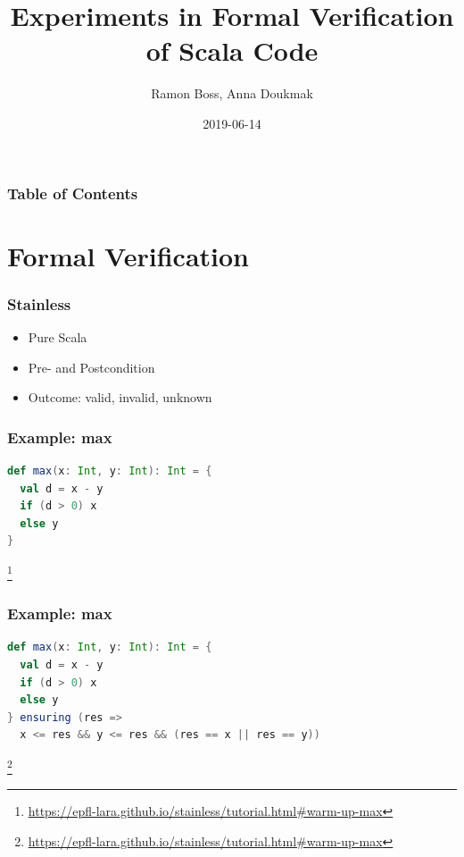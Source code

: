 \documentclass{beamer}
\newcommand\blfootnote[1]{%
  \begingroup
  \renewcommand\thefootnote{}\footnote{#1}%
  \addtocounter{footnote}{-1}%
  \endgroup
}
\begin{document}
\title{Experiments in Formal Verification of Scala Code}
\author{Ramon Boss, Anna Doukmak}

\date{2019-06-14}

\frame{\titlepage}


\begin{frame}
  \frametitle{Table of Contents}
  \tableofcontents
\end{frame}


\section{Formal Verification}


\begin{frame}
\frametitle{Stainless}
\begin{itemize}
  \item Pure Scala
  \item Pre- and Postcondition
  \item Outcome: valid, invalid, unknown
\end{itemize}
\end{frame}


\begin{frame}[fragile]
\frametitle{Example: max}
\begin{lstlisting}[language=Scala]
def max(x: Int, y: Int): Int = {
  val d = x - y
  if (d > 0) x
  else y
}
\end{lstlisting}
\blfootnote{\url{https://epfl-lara.github.io/stainless/tutorial.html\#warm-up-max}}
\end{frame}


\begin{frame}[fragile]
\frametitle{Example: max}
\begin{lstlisting}[language=Scala]
def max(x: Int, y: Int): Int = {
  val d = x - y
  if (d > 0) x
  else y
} ensuring (res =>
  x <= res && y <= res && (res == x || res == y))
\end{lstlisting}
\blfootnote{\url{https://epfl-lara.github.io/stainless/tutorial.html\#warm-up-max}}
\end{frame}
\end{document}
